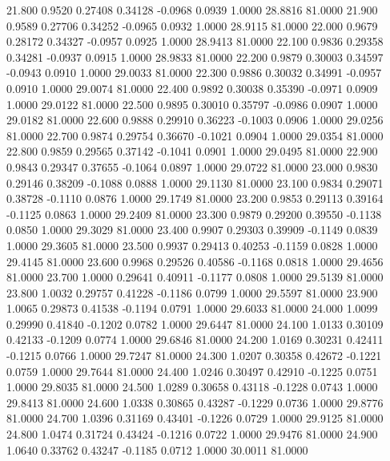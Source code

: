   21.800   0.9520   0.27408   0.34128  -0.0968   0.0939   1.0000  28.8816  81.0000
  21.900   0.9589   0.27706   0.34252  -0.0965   0.0932   1.0000  28.9115  81.0000
  22.000   0.9679   0.28172   0.34327  -0.0957   0.0925   1.0000  28.9413  81.0000
  22.100   0.9836   0.29358   0.34281  -0.0937   0.0915   1.0000  28.9833  81.0000
  22.200   0.9879   0.30003   0.34597  -0.0943   0.0910   1.0000  29.0033  81.0000
  22.300   0.9886   0.30032   0.34991  -0.0957   0.0910   1.0000  29.0074  81.0000
  22.400   0.9892   0.30038   0.35390  -0.0971   0.0909   1.0000  29.0122  81.0000
  22.500   0.9895   0.30010   0.35797  -0.0986   0.0907   1.0000  29.0182  81.0000
  22.600   0.9888   0.29910   0.36223  -0.1003   0.0906   1.0000  29.0256  81.0000
  22.700   0.9874   0.29754   0.36670  -0.1021   0.0904   1.0000  29.0354  81.0000
  22.800   0.9859   0.29565   0.37142  -0.1041   0.0901   1.0000  29.0495  81.0000
  22.900   0.9843   0.29347   0.37655  -0.1064   0.0897   1.0000  29.0722  81.0000
  23.000   0.9830   0.29146   0.38209  -0.1088   0.0888   1.0000  29.1130  81.0000
  23.100   0.9834   0.29071   0.38728  -0.1110   0.0876   1.0000  29.1749  81.0000
  23.200   0.9853   0.29113   0.39164  -0.1125   0.0863   1.0000  29.2409  81.0000
  23.300   0.9879   0.29200   0.39550  -0.1138   0.0850   1.0000  29.3029  81.0000
  23.400   0.9907   0.29303   0.39909  -0.1149   0.0839   1.0000  29.3605  81.0000
  23.500   0.9937   0.29413   0.40253  -0.1159   0.0828   1.0000  29.4145  81.0000
  23.600   0.9968   0.29526   0.40586  -0.1168   0.0818   1.0000  29.4656  81.0000
  23.700   1.0000   0.29641   0.40911  -0.1177   0.0808   1.0000  29.5139  81.0000
  23.800   1.0032   0.29757   0.41228  -0.1186   0.0799   1.0000  29.5597  81.0000
  23.900   1.0065   0.29873   0.41538  -0.1194   0.0791   1.0000  29.6033  81.0000
  24.000   1.0099   0.29990   0.41840  -0.1202   0.0782   1.0000  29.6447  81.0000
  24.100   1.0133   0.30109   0.42133  -0.1209   0.0774   1.0000  29.6846  81.0000
  24.200   1.0169   0.30231   0.42411  -0.1215   0.0766   1.0000  29.7247  81.0000
  24.300   1.0207   0.30358   0.42672  -0.1221   0.0759   1.0000  29.7644  81.0000
  24.400   1.0246   0.30497   0.42910  -0.1225   0.0751   1.0000  29.8035  81.0000
  24.500   1.0289   0.30658   0.43118  -0.1228   0.0743   1.0000  29.8413  81.0000
  24.600   1.0338   0.30865   0.43287  -0.1229   0.0736   1.0000  29.8776  81.0000
  24.700   1.0396   0.31169   0.43401  -0.1226   0.0729   1.0000  29.9125  81.0000
  24.800   1.0474   0.31724   0.43424  -0.1216   0.0722   1.0000  29.9476  81.0000
  24.900   1.0640   0.33762   0.43247  -0.1185   0.0712   1.0000  30.0011  81.0000

